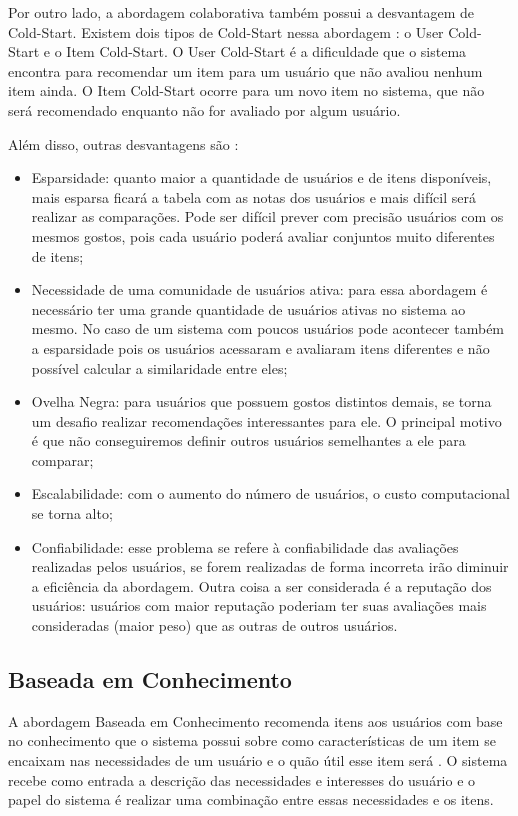 Por outro lado, a abordagem colaborativa também possui a desvantagem de Cold-Start. Existem dois tipos de Cold-Start
nessa abordagem \cite{adomavicius2005toward}: o User Cold-Start e o Item Cold-Start. O User Cold-Start é a dificuldade
que o sistema encontra para recomendar um item para um usuário que não avaliou nenhum item ainda. O Item Cold-Start
ocorre para um novo item no sistema, que não será recomendado enquanto não for avaliado por algum usuário.

Além disso, outras desvantagens são \cite{adomavicius2005toward}:

\begin{itemize}
\item Esparsidade: quanto maior a quantidade de usuários e de itens disponíveis, mais esparsa ficará a tabela com as
notas dos usuários e mais difícil será realizar as comparações. Pode ser difícil prever com precisão usuários com os
mesmos gostos, pois cada usuário poderá avaliar conjuntos muito diferentes de itens;
\item Necessidade de uma comunidade de usuários ativa: para essa abordagem é necessário ter uma grande quantidade de
usuários ativas no sistema ao mesmo. No caso de um sistema com poucos usuários pode acontecer também a esparsidade
pois os usuários acessaram e avaliaram itens diferentes e  não possível calcular a similaridade entre eles;
\item Ovelha Negra: para usuários que possuem gostos distintos demais, se torna um desafio realizar recomendações
interessantes para ele. O principal motivo é que não conseguiremos definir outros usuários semelhantes a ele para comparar;
\item Escalabilidade: com o aumento do número de usuários, o custo computacional se torna alto;
\item Confiabilidade: esse problema se refere à confiabilidade das avaliações realizadas pelos usuários, se forem
realizadas de forma incorreta irão diminuir a eficiência da abordagem. Outra coisa a ser considerada é a reputação dos
usuários: usuários com maior reputação poderiam ter suas avaliações mais consideradas (maior peso) que as outras de
outros usuários.
\end{itemize}

\subsection{Baseada em Conhecimento}

A abordagem Baseada em Conhecimento recomenda itens aos usuários com base no conhecimento que o sistema possui sobre
como características de um item se encaixam nas necessidades de um usuário e o quão útil esse item será
\cite{ricci2011introduction}. O sistema recebe como entrada a descrição das necessidades e interesses do usuário e o
papel do sistema é realizar uma combinação entre essas necessidades e os itens.

